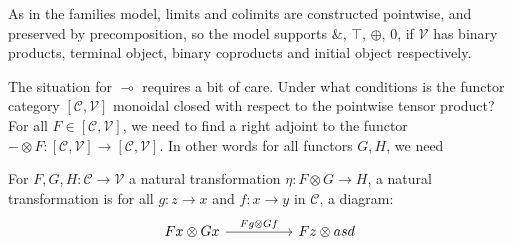 As in the families model, limits and colimits are constructed pointwise, and preserved by precomposition, so the model supports $\&$, $\top$, $\oplus$, $0$, if $\mathcal{V}$ has binary products, terminal object, binary coproducts and initial object respectively.


The situation for $\multimap$ requires a bit of care. Under what conditions is the functor category $[\mathcal{C}, \mathcal{V}]$ monoidal closed with respect to the pointwise tensor product? For all $F \in [\mathcal{C}, \mathcal{V}]$, we need to find a right adjoint to the functor $- \otimes F : [\mathcal{C},\mathcal{V}] \to [\mathcal{C}, \mathcal{V}]$. In other words for all functors $G, H$, we need 

For $F, G, H : \mathcal{C} \to \mathcal{V}$ a natural transformation $\eta : F \otimes G \to H$, a natural transformation is for all $g : z \to x$ and $f : x \to y$ in $\mathcal{C}$, a diagram:
\[
  \ti
  Fx \otimes Gx  \ar[r, "{Fg \otimes Gf}"] & Fz \otimes asd
  \kz
\]


